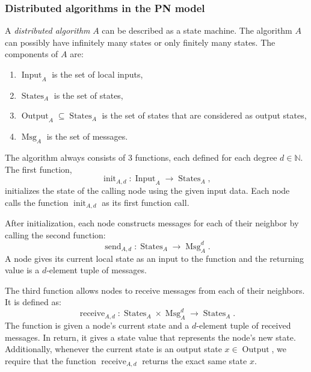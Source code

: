 \subsubsection{Distributed algorithms in the PN model}

\newcommand{\algin}{\operatorname{Input}}
\newcommand{\algstates}{\operatorname{States}}
\newcommand{\algout}{\operatorname{Output}}
\newcommand{\algmsg}{\operatorname{Msg}}

\newcommand{\alginit}{\operatorname{init}}
\newcommand{\algsend}{\operatorname{send}}
\newcommand{\algrecv}{\operatorname{receive}}

A \emph{distributed algorithm} $A$ can be described as a state machine.
The algorithm $A$ can possibly have infinitely many states or only finitely many states.
The components of $A$ are:
\begin{enumerate}
  \item $\algin_A$ is the set of local inputs,
  \item $\algstates_A$ is the set of states,
  \item $\algout_A \subseteq \algstates_A$ is the set of states that are considered as output states,
  \item $\algmsg_A$ is the set of messages.
\end{enumerate}

The algorithm always consists of 3 functions, each defined for each degree $d \in \mathbb{N}$.
The first function, \[ \alginit_{A,d}\colon \algin_A \rightarrow \algstates_A, \] initializes the state of the calling node using the given input data.
Each node calls the function $\alginit_{A,d}$ as its first function call.

After initialization, each node constructs messages for each of their neighbor by calling the second function:
\[ \algsend_{A,d}\colon \algstates_A \rightarrow \algmsg_A^d. \]
A node gives its current local state as an input to the function and the returning value is a $d$-element tuple of messages.

The third function allows nodes to receive messages from each of their neighbors.
It is defined as:
\[ \algrecv_{A,d}\colon \algstates_A \times \algmsg_A^d \rightarrow \algstates_A. \]
The function is given a node's current state and a $d$-element tuple of received messages.
In return, it gives a state value that represents the node's new state.
Additionally, whenever the current state is an output state $x \in \algout$, we require that the function $\algrecv_{A,d}$ returns the exact same state $x$.

